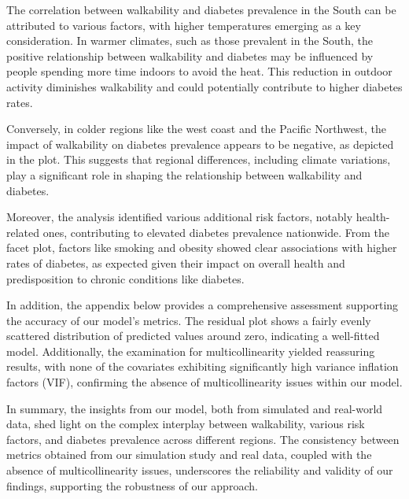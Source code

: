 \documentclass[
]{article}
\begin{document}
The correlation between walkability and diabetes prevalence in the South
can be attributed to various factors, with higher temperatures emerging
as a key consideration. In warmer climates, such as those prevalent in
the South, the positive relationship between walkability and diabetes
may be influenced by people spending more time indoors to avoid the
heat. This reduction in outdoor activity diminishes walkability and
could potentially contribute to higher diabetes rates.

Conversely, in colder regions like the west coast and the Pacific
Northwest, the impact of walkability on diabetes prevalence appears to
be negative, as depicted in the plot. This suggests that regional
differences, including climate variations, play a significant role in
shaping the relationship between walkability and diabetes.

Moreover, the analysis identified various additional risk factors,
notably health-related ones, contributing to elevated diabetes
prevalence nationwide. From the facet plot, factors like smoking and
obesity showed clear associations with higher rates of diabetes, as
expected given their impact on overall health and predisposition to
chronic conditions like diabetes.

In addition, the appendix below provides a comprehensive assessment
supporting the accuracy of our model's metrics. The residual plot shows
a fairly evenly scattered distribution of predicted values around zero,
indicating a well-fitted model. Additionally, the examination for
multicollinearity yielded reassuring results, with none of the
covariates exhibiting significantly high variance inflation factors
(VIF), confirming the absence of multicollinearity issues within our
model.

In summary, the insights from our model, both from simulated and
real-world data, shed light on the complex interplay between
walkability, various risk factors, and diabetes prevalence across
different regions. The consistency between metrics obtained from our
simulation study and real data, coupled with the absence of
multicollinearity issues, underscores the reliability and validity of
our findings, supporting the robustness of our approach.
\end{document}
